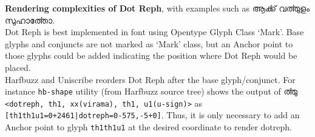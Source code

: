 \textbf{Rendering complexities of Dot Reph}, with examples such as {\meera ആൎക്ക്  വൎത്തുളം  സുഹാൎത്തോ}.\\
Dot Reph is best implemented in font using Opentype Glyph Class ‘Mark’. Base glyphs and conjuncts are not marked as ‘Mark’ class, but an Anchor point to those glyphs could be added indicating the position where Dot Reph would be placed.\\
Harfbuzz and Uniscribe reorders Dot Reph after the base glyph/conjunct. For instance \texttt{hb-shape} utility (from Harfbuzz source tree) shows the output of {\meera ൎത്തു} \texttt{<dotreph, th1, xx(virama), th1, u1(u-sign)>} as \\  \texttt{[th1th1u1=0+2461|dotreph=0\@-575,-5+0]}. Thus, it is only necessary to add an Anchor point to glyph \texttt{th1th1u1} at the desired coordinate to render dotreph.\\

